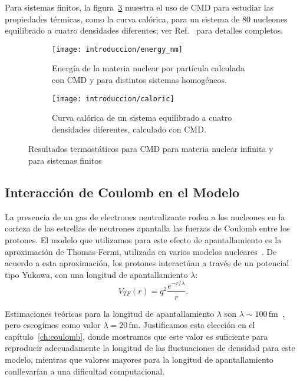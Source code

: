 Para sistemas finitos, la figura~\ref{fig:caloric} muestra el uso de CMD para estudiar las propiedades térmicas, como la curva calórica, para un sistema de 80 nucleones equilibrado a cuatro densidades diferentes; ver Ref.~\cite{dorso_isoscaling_2011} para detalles completos.

\begin{figure}[h]
  \centering
  \begin{subfigure}[h!]{0.48\columnwidth}
    \texttt{[image: introduccion/energy\_nm]}
  \caption{Energía de la materia nuclear por partícula calculada con CMD y para distintos sistemas homogéneos.}
  \label{fig:energy_nm}
  \end{subfigure}
  \begin{subfigure}[h!]{0.48\columnwidth}
  \texttt{[image: introduccion/caloric]}
  \caption{Curva calórica de un sistema equilibrado a cuatro densidades diferentes, calculado con CMD.}
  \label{fig:caloric}
  \end{subfigure}
  \caption{Resultados termostáticos para CMD para materia nuclear infinita y para sistemas finitos}
\end{figure}


\subsection{Interacción de Coulomb en el Modelo}\label{sc:coulomb}

La presencia de un gas de electrones neutralizante rodea a los nucleones en la corteza de las estrellas de neutrones apantalla las fuerzas de Coulomb entre los protones.
El modelo que utilizamos para este efecto de apantallamiento es la aproximación de Thomas-Fermi, utilizada en varios modelos nucleares~\cite{maruyama_quantum_1998, dorso_topological_2012, horowitz_neutrino-pasta_2004}.
De acuerdo a esta aproximación, los protones interactúan a través de un potencial tipo Yukawa, con una longitud de apantallamiento $\lambda$:
\begin{equation*}
 V_{TF}(r) = q^2\frac{e^{-r/\lambda}}{r}.
\end{equation*}

Estimaciones teóricas para la longitud de apantallamiento $\lambda$ son $\lambda\sim100\,\text{fm}$~\cite{fetter_quantum_2003}, pero escogimos como valor $\lambda=20\,\text{fm}$.
Justificamos esta elección en el capítulo~\ref{ch:coulomb}, donde mostramos que este valor es suficiente para reproducir adecuadamente la longitud de las fluctuaciones de densidad para este modelo, mientras que valores mayores para la longitud de apantallamiento conllevarían a una dificultad computacional.

